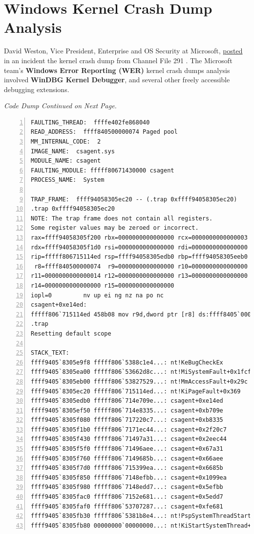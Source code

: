 \section{Windows Kernel Crash Dump Analysis}

David Weston, Vice President, Enterprise and OS Security at Microsoft, \href{https://www.microsoft.com/en-us/security/blog/2024/07/27/windows-security-best-practices-for-integrating-and-managing-security-tools/}{posted} in an incident
the kernel crash dump from Channel File 291 \cite{weston_windows_security_2024}. The Microsoft team's \textbf{Windows Error Reporting (WER)}
kernel crash dumps analysis involved \textbf{WinDBG Kernel Debugger}, and several other freely accessible debugging extensions. 

\vfill
\begin{center}
\textit{Code Dump Continued on Next Page.}
\end{center}
\vfill

\newpage

\label{sec:windbg}
\begin{lstlisting}[caption=WinDBG Kernel Crash Dump, numbers=left]
FAULTING_THREAD:  ffffe402fe868040
READ_ADDRESS:  ffff840500000074 Paged pool
MM_INTERNAL_CODE:  2
IMAGE_NAME:  csagent.sys
MODULE_NAME: csagent
FAULTING_MODULE: fffff80671430000 csagent
PROCESS_NAME:  System
 
TRAP_FRAME:  ffff94058305ec20 -- (.trap 0xffff94058305ec20)
.trap 0xffff94058305ec20
NOTE: The trap frame does not contain all registers.
Some register values may be zeroed or incorrect.
rax=ffff94058305f200 rbx=0000000000000000 rcx=0000000000000003
rdx=ffff94058305f1d0 rsi=0000000000000000 rdi=0000000000000000
rip=fffff806715114ed rsp=ffff94058305edb0 rbp=ffff94058305eeb0
 r8=ffff840500000074  r9=0000000000000000 r10=0000000000000000
r11=0000000000000014 r12=0000000000000000 r13=0000000000000000
r14=0000000000000000 r15=0000000000000000
iopl=0         nv up ei ng nz na po nc
csagent+0xe14ed:
fffff806`715114ed 458b08 mov r9d,dword ptr [r8] ds:ffff8405`00000074=???... 
.trap
Resetting default scope
 
STACK_TEXT:  
ffff9405`8305e9f8 fffff806`5388c1e4...: nt!KeBugCheckEx 
ffff9405`8305ea00 fffff806`53662d8c...: nt!MiSystemFault+0x1fcf94  
ffff9405`8305eb00 fffff806`53827529...: nt!MmAccessFault+0x29c 
ffff9405`8305ec20 fffff806`715114ed...: nt!KiPageFault+0x369 
ffff9405`8305edb0 fffff806`714e709e...: csagent+0xe14ed
ffff9405`8305ef50 fffff806`714e8335...: csagent+0xb709e
ffff9405`8305f080 fffff806`717220c7...: csagent+0xb8335
ffff9405`8305f1b0 fffff806`7171ec44...: csagent+0x2f20c7
ffff9405`8305f430 fffff806`71497a31...: csagent+0x2eec44
ffff9405`8305f5f0 fffff806`71496aee...: csagent+0x67a31
ffff9405`8305f760 fffff806`7149685b...: csagent+0x66aee
ffff9405`8305f7d0 fffff806`715399ea...: csagent+0x6685b
ffff9405`8305f850 fffff806`7148efbb...: csagent+0x1099ea
ffff9405`8305f980 fffff806`7148edd7...: csagent+0x5efbb
ffff9405`8305fac0 fffff806`7152e681...: csagent+0x5edd7
ffff9405`8305faf0 fffff806`53707287...: csagent+0xfe681
ffff9405`8305fb30 fffff806`5381b8e4...: nt!PspSystemThreadStartup+0x57 
ffff9405`8305fb80 00000000`00000000...: nt!KiStartSystemThread+0x34 
\end{lstlisting}


